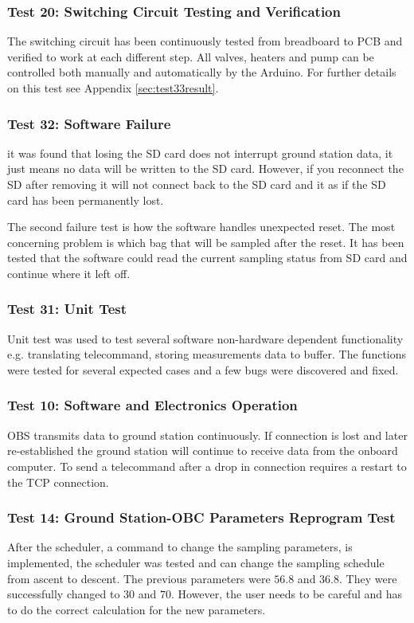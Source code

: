 \subsubsection{Test 20: Switching Circuit Testing and Verification}

The switching circuit has been continuously tested from breadboard to PCB and verified to work at each different step. All valves, heaters and pump can be controlled both manually and automatically by the Arduino. For further details on this test see Appendix \ref{sec:test33result}.

\subsubsection{Test 32: Software Failure}

it was found that losing the SD card does not interrupt ground station data, it just means no data will be written to the SD card. However, if you reconnect the SD after removing it will not connect back to the SD card and it as if the SD card has been permanently lost.\par

The second failure test is how the software handles unexpected reset. The most concerning problem is which bag that will be sampled after the reset. It has been tested that the software could read the current sampling status from SD card and continue where it left off. 

\subsubsection{Test 31: Unit Test}
Unit test was used to test several software non-hardware dependent functionality e.g. translating telecommand, storing measurements data to buffer. The functions were tested for several expected cases and a few bugs were discovered and fixed.

\subsubsection{Test 10: Software and Electronics Operation}
OBS transmits data to ground station continuously. If connection is lost and later re-established the ground station will continue to receive data from the onboard computer. To send a telecommand after a drop in connection requires a restart to the TCP connection. 

\subsubsection{Test 14: Ground Station-OBC Parameters Reprogram Test}
After the scheduler, a command to change the sampling parameters, is implemented, the scheduler was tested and can change the sampling schedule from ascent to descent. The previous parameters were $56.8$ and $36.8$. They were successfully changed to $30$ and $70$. However, the user needs to be careful and has to do the correct calculation for the new parameters.

